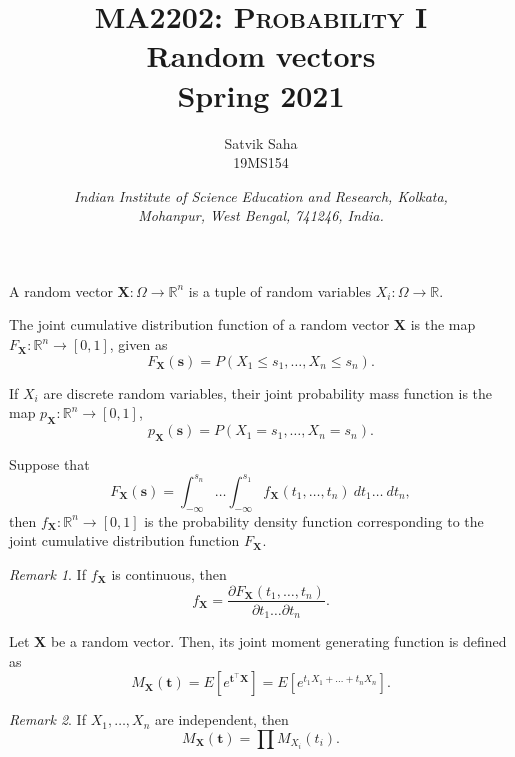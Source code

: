 \documentclass[11pt]{article}
\title{
    \Large\textsc{MA2202: Probability I} \\
    \Huge \textbf{Random vectors} \\
    \vspace{5pt}
    \Large{Spring 2021}
}
\author{
    \large Satvik Saha%
    \\\textsc{\small 19MS154}
}
\date{\normalsize
    \textit{Indian Institute of Science Education and Research, Kolkata, \\
    Mohanpur, West Bengal, 741246, India.} \\
}
\def\R{\mathbb{R}}
\newcommand\E[1]{E\left[#1\right]}
\renewcommand\vec[1]{\boldsymbol{#1}}
\def\vX{\vec{X}}
\def\vt{\vec{t}}
\theoremstyle{definition}
\theoremstyle{remark}
\newtheorem*{remark}{Remark}
\numberwithin{equation}{module}
\begin{document}
    \maketitle

    \begin{definition}
        A random vector $\vX\colon \Omega \to \R^n$ is a tuple of random 
        variables $X_i\colon \Omega \to \R$.
    \end{definition}
    \begin{definition}
        The joint cumulative distribution function of a random vector $\vX$ is
        the map $F_{\vX}\colon \R^n \to [0, 1]$, given as \[
            F_{\vX}(\vec{s}) = P(X_1 \leq s_1, \dots, X_n \leq s_n).
        \] 
    \end{definition}

    \begin{definition}
        If $X_i$ are discrete random variables, their joint probability mass 
        function is the map $p_{\vX} \colon \R^n \to [0, 1]$, \[
            p_{\vX}(\vec{s}) = P(X_1 = s_1, \dots, X_n = s_n).
        \] 
    \end{definition}

    \begin{definition}
        Suppose that \[
            F_{\vX}(\vec{s}) = \int_{-\infty}^{s_n} \dots \int_{-\infty}^{s_1}
            f_{\vX}(t_1, \dots, t_n)\:dt_1\dots\:dt_n,
        \] then $f_{\vX}\colon \R^n \to [0, 1]$ is the probability density
        function corresponding to the joint cumulative distribution function
        $F_{\vX}$.

        \begin{remark}
            If $f_{\vX}$ is continuous, then \[
                f_{\vX} = \frac{\partial F_{\vX}(t_1, \dots, t_n)}{\partial
                t_1\dots\partial t_n}.
            \] 
        \end{remark}
    \end{definition}

    \begin{definition}
        Let $\vX$ be a random vector. Then, its joint moment generating function
        is defined as \[
            M_{\vX}(\vt) = \E{e^{\vt^\top \!\vX}} = \E{e^{t_1X_1 +
            \dots + t_nX_n}}.
        \] 
        \begin{remark}
            If $X_1, \dots, X_n$ are independent, then \[
                M_{\vX}(\vt) = \prod M_{X_i}(t_i).
            \] 
        \end{remark} 
    \end{definition}
\end{document}
